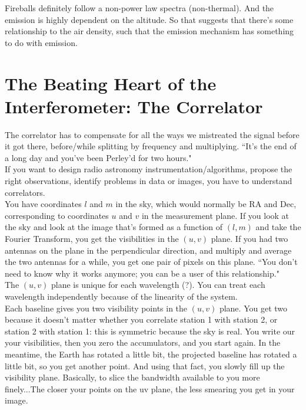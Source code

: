 \documentclass[a4paper]{article}
\begin{document}
Fireballs definitely follow a non-power law spectra (non-thermal). And the emission is highly dependent on the altitude. So that suggests that there's some relationship to the air density, such that the emission mechanism has something to do with emission.

\section{The Beating Heart of the Interferometer: The Correlator}

The correlator has to compensate for all the ways we mistreated the signal before it got there, before/while splitting by frequency and multiplying. ``It's the end of a long day and you've been Perley'd for two hours." \\

If you want to design radio astronomy instrumentation/algorithms, propose the right observations, identify problems in data or images, you have to understand correlators. \\

You have coordinates $l$ and $m$ in the sky, which would normally be RA and Dec, corresponding to coordinates $u$ and $v$ in the measurement plane. If you look at the sky and look at the image that's formed as a function of $(l,m)$ and take the Fourier Transform, you get the visibilities in the $(u,v)$ plane. If you had two antennas on the plane in the perpendicular direction, and multiply and average the two antennas for a while, you get one pair of pixels on this plane. ``You don't need to know why it works anymore; you can be a user of this relationship." \\

The $(u,v)$ plane is unique for each wavelength (?). You can treat each wavelength independently because of the linearity of the system. \\

Each baseline gives you two visibility points in the $(u,v)$ plane. You get two because it doesn't matter whether you correlate station 1 with station 2, or station 2 with station 1: this is symmetric because the sky is real. You write our your visibilities, then you zero the accumulators, and you start again. In the meantime, the Earth has rotated a little bit, the projected baseline has rotated a little bit, so you get another point. And using that fact, you slowly fill up the visibility plane. Basically, to slice the bandwidth available to you more finely...The closer your points on the uv plane, the less smearing you get in your image. \\
\end{document}
